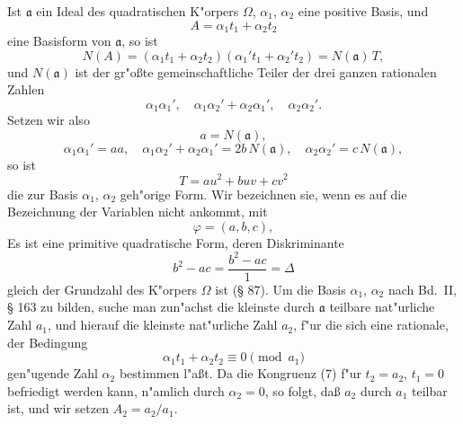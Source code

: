 \documentclass[12pt,a4paper]{article}
\theoremstyle{plain}
\begin{document}
Ist $\mathfrak{a}$ ein Ideal des quadratischen K"orpers $\Omega$, $\alpha_1$, $\alpha_2$ eine positive Basis, und
\begin{equation}
A = \alpha_1 t_1 + \alpha_2 t_2
\tag{1}
\end{equation}
eine Basisform von $\mathfrak{a}$, so ist
\begin{equation}
N(A) = (\alpha_1 t_1 + \alpha_2 t_2)(\alpha_1' t_1 + \alpha_2' t_2) = N(\mathfrak{a})\,T,
\tag{2}
\end{equation}
und $N(\mathfrak{a})$ ist der gr"o\ss te gemeinschaftliche Teiler der drei ganzen rationalen Zahlen
\[
\alpha_1\alpha_1',\quad \alpha_1\alpha_2' + \alpha_2\alpha_1',\quad \alpha_2\alpha_2'.
\]
Setzen wir also
\[
a = N(\mathfrak{a}),
\]
\begin{equation}
\alpha_1\alpha_1' = aa,\quad \alpha_1\alpha_2' + \alpha_2\alpha_1' = 2b\,N(\mathfrak{a}),\quad \alpha_2\alpha_2' = c\,N(\mathfrak{a}),
\tag{3}
\end{equation}
so ist
\begin{equation}
T = au^2 + buv + cv^2
\tag{4}
\end{equation}
die zur Basis $\alpha_1$, $\alpha_2$ geh"orige Form. Wir bezeichnen sie, wenn es auf die Bezeichnung der Variablen nicht ankommt, mit
\begin{equation}
\varphi = (a, b, c),
\tag{5}
\end{equation}
Es ist eine primitive quadratische Form, deren Diskriminante
\begin{equation}
b^2 - ac = \frac{b^2 - ac}{1} = \Delta
\tag{6}
\end{equation}
gleich der Grundzahl des K"orpers $\Omega$ ist (\S{} 87). Um die Basis $\alpha_1$, $\alpha_2$ nach Bd.~II, \S{} 163 zu bilden, suche man zun"achst die kleinste durch $\mathfrak{a}$ teilbare nat"urliche Zahl $a_1$, und hierauf die kleinste nat"urliche Zahl $a_2$, f"ur die sich eine rationale, der Bedingung
\begin{equation}
\alpha_1 t_1 + \alpha_2 t_2 \equiv 0 \pmod{a_1}
\tag{7}
\end{equation}
gen"ugende Zahl $\alpha_2$ bestimmen l"a\ss t. Da die Kongruenz (7) f"ur $t_2 = a_2$, $t_1 = 0$ befriedigt werden kann, n"amlich durch $\alpha_2 = 0$, so folgt, da\ss{} $a_2$ durch $a_1$ teilbar ist, und wir setzen $A_2 = a_2/a_1$.
\end{document}
